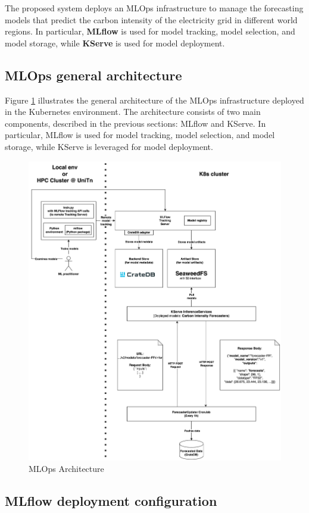 The proposed system deploys an MLOps infrastructure to manage the forecasting models that predict the carbon intensity of the electricity grid in different world regions.
In particular, \textbf{MLflow} is used for model tracking, model selection, and model storage, while \textbf{KServe} is used for model deployment.

\subsection{MLOps general architecture}

Figure \ref{fig:mlops} illustrates the general architecture of the MLOps infrastructure deployed in the Kubernetes environment. 
The architecture consists of two main components, described in the previous sections: MLflow and KServe.
In particular, MLflow is used for model tracking, model selection, and model storage, while KServe is leveraged for model deployment. 

\begin{figure}[t]
  \centering
  \includegraphics[width=0.75\linewidth]{images/mlflow_vertical.png}
  \caption{MLOps Architecture}
  \label{fig:mlops}
\end{figure}

\subsection{MLflow deployment configuration}

